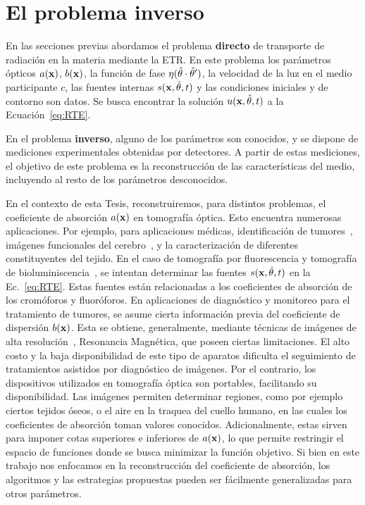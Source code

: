 \pagestyle{fancy}
\chapter{El problema inverso}
\lhead{\thepage}
\vspace{0.01\textheight}
\label{sec:inverso}
\pagebreak

En las secciones previas abordamos el problema {\bf directo} de transporte 
de radiación en la materia mediante la ETR. 
En este problema los parámetros ópticos $a(\mathbf{x})$, $b(\mathbf{x})$, la función  
de fase $\eta(\hat{\theta}\cdot \hat{\theta}')$, la velocidad de la luz en el medio participante 
$c$, las fuentes internas $s(\mathbf{x},\hat{\theta},t)$ y las condiciones iniciales y de contorno 
son datos. Se busca encontrar la solución $u(\mathbf{x},\hat{\theta},t)$ a la Ecuación~\eqref{eq:RTE}.

En el problema {\bf inverso}, alguno de los parámetros son conocidos, 
 y se dispone de mediciones experimentales  
obtenidas por detectores. 
A partir de estas mediciones, 
el objetivo de este problema es la reconstrucción de las características del medio, incluyendo 
al resto de los parámetros desconocidos. 

En el contexto de esta Tesis, reconstruiremos, para distintos problemas, 
 el coeficiente de absorción $a(\mathbf{x})$ en tomografía óptica. Esto encuentra numerosas aplicaciones. Por ejemplo, 
 para aplicaciones médicas, identificación de tumores~\cite{Zhu2005,Zhu2010,Fujii2016b}, imágenes funcionales del cerebro~\cite{Boas2001,bluestone2001,Arridge1999}, 
y la caracterización de diferentes constituyentes del tejido.
En el caso de tomografía por fluorescencia y tomografía de bioluminiscencia~\cite{Klose2005,Klose2009,Ren2010},
 se intentan determinar 
las fuentes $s(\mathbf{x},\hat{\theta},t)$ en la Ec.~\eqref{eq:RTE}. 
Estas fuentes están relacionadas a los coeficientes de absorción de los 
cromóforos y fluoróforos. 
En aplicaciones de diagnóstico y monitoreo para el tratamiento de tumores, 
se asume cierta información previa  
del coeficiente de dispersión 
$b(\mathbf{x})$. Esta se obtiene, generalmente, mediante técnicas de 
 imágenes de alta resolución~\cite{Althobaiti2017,Guven2003}, \eg Resonancia Magnética, que poseen ciertas limitaciones.   
 El alto costo y la baja disponibilidad 
de este tipo de aparatos dificulta el seguimiento de tratamientos  
asistidos por diagnóstico de imágenes. 
Por el contrario, los dispositivos 
utilizados en tomografía óptica son portables, facilitando su disponibilidad. 
Las imágenes permiten determinar regiones, 
como por ejemplo ciertos tejidos óseos, o 
el aire en la traquea del cuello humano, en las cuales 
los coeficientes de absorción toman valores conocidos.  
Adicionalmente, estas sirven para imponer cotas superiores e inferiores 
de $a(\mathbf{x})$, lo que permite restringir el espacio de funciones donde se busca minimizar 
la función objetivo. Si bien en 
este trabajo nos enfocamos en la reconstrucción del coeficiente 
de absorción, los algoritmos y las estrategias propuestas 
pueden ser fácilmente generalizadas para otros parámetros. 

